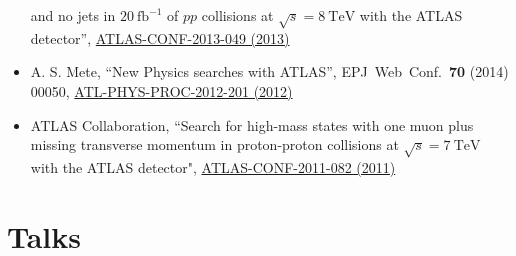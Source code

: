 \documentclass[a4paper,10pt]{article}
\begin{document}
\begin{itemize}
	and no jets in $20\ \mathrm{fb}^{-1}$ of $pp$ collisions at $\sqrt{s} = 8\ \mathrm{TeV}$ with the ATLAS detector'', 
	\href{https://atlas.web.cern.ch/Atlas/GROUPS/PHYSICS/CONFNOTES/ATLAS-CONF-2013-049/}{ATLAS-CONF-2013-049 (2013)} 
	\item A. S. Mete, 
	``New Physics searches with ATLAS'', 
	EPJ\ Web\ Conf.\ {\bf 70} (2014) 00050, 
	\href{https://cds.cern.ch/record/1478973}{ATL-PHYS-PROC-2012-201 (2012)}
	\item ATLAS Collaboration, 
	``Search for high-mass states with one muon plus missing transverse momentum in proton-proton collisions at $\sqrt{s} = 7\ \mathrm{TeV}$ with the ATLAS detector", 
	\href{https://atlas.web.cern.ch/Atlas/GROUPS/PHYSICS/CONFNOTES/ATLAS-CONF-2011-082/}{ATLAS-CONF-2011-082 (2011)}
\end{itemize}

\vspace{3mm}
\section{Talks}
\end{document}

